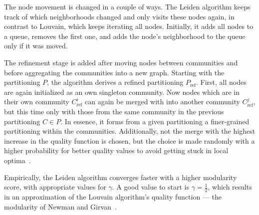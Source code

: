             The node movement is changed in a couple of ways.
            The Leiden algorithm keeps track of which neighborhoods changed and only visits these nodes again, in contrast to Louvain, which keeps iterating all nodes\autocite{movb, movc}.
            Initially, it adds all nodes to a queue, removes the first one, and adds the node's neighborhood to the queue only if it was moved.
            
            The refinement stage is added after moving nodes between communities and before aggregating the communities into a new graph.
            Starting with the partitioning $P$, the algorithm derives a refined partitioning $P_{\text{ref}}$.
            First, all nodes are again initialized as an own singleton community. 
            Now nodes which are in their own community $C^i_{\text{ref}}$ can again be merged with into another community $C^j_{\text{ref}}$, but this time only with those from the same community in the previous partitioning $C \in P$. 
            In essence, it forms from a given partitioning a finer-grained partitioning within the communities.
            Additionally, not the merge with the highest increase in the quality function is chosen, but the choice is made randomly with a higher probability for better quality values to avoid getting stuck in local optima~\autocite{mova}.
            
            Empirically, the Leiden algorithm converges faster with a higher modularity score, with appropriate values for $\gamma$. A good value to start is $\gamma = \frac{1}{2}$, which results in an approximation of the Louvain algorithm's quality function --- the modularity of Newman and Girvan~\autocite{girvan2002community}.
\newpage
